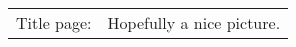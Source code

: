 \thispagestyle{empty}
\vspace*{\fill}

\begin{flushleft}
    
    \begin{tabularx}{\textwidth}{lX}
    Title page:  & Hopefully a nice picture. \\
    \end{tabularx}

\end{flushleft}
